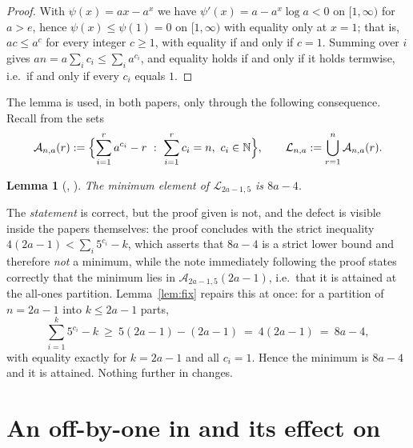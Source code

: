 \documentclass[11pt,a4paper]{article}
\theoremstyle{plain}
\newtheorem{lemma}[theorem]{Lemma}
\theoremstyle{definition}
\newcommand{\NN}{\mathbb{N}}
\begin{document}
\begin{proof}
With $\psi(x)=ax-a^{x}$ we have $\psi'(x)=a-a^{x}\log a<0$ on $[1,\infty)$ for $a>e$,
hence $\psi(x)\le\psi(1)=0$ on $[1,\infty)$ with equality only at $x=1$; that is,
$ac\le a^{c}$ for every integer $c\ge 1$, with equality if and only if $c=1$. Summing
over $i$ gives $an=a\sum_{i}c_{i}\le\sum_{i}a^{c_{i}}$, and equality holds if and
only if it holds termwise, i.e.\ if and only if every $c_{i}$ equals $1$.
\end{proof}

The lemma is used, in both papers, only through the following consequence. Recall
from \cite{CMM10,CMM20} the sets
\[
  \mathcal{A}_{n,a}(r):=\Bigl\{\sum_{i=1}^{r}a^{c_{i}}-r\ :\
    \sum_{i=1}^{r}c_{i}=n,\ c_{i}\in\NN\Bigr\},
  \qquad
  \mathcal{L}_{n,a}:=\bigcup_{r=1}^{n}\mathcal{A}_{n,a}(r).
\]

\begin{lemma}[{\cite[Lemma 3.6]{CMM10}}, {\cite[Lemma 24]{CMM20}}]\label{lem:min}
The minimum element of $\mathcal{L}_{2a-1,5}$ is $8a-4$.
\end{lemma}

The \emph{statement} is correct, but the proof given is not, and the defect is
visible inside the papers themselves: the proof concludes with the strict inequality
$4(2a-1)<\sum_{i}5^{c_{i}}-k$, which asserts that $8a-4$ is a strict lower bound and
therefore \emph{not} a minimum, while the note immediately following the proof states
correctly that the minimum lies in $\mathcal{A}_{2a-1,5}(2a-1)$, i.e.\ that it is
attained at the all-ones partition. Lemma~\ref{lem:fix} repairs this at once: for a
partition of $n=2a-1$ into $k\le 2a-1$ parts,
\[
  \sum_{i=1}^{k}5^{c_{i}}-k\ \ge\ 5(2a-1)-(2a-1)\ =\ 4(2a-1)\ =\ 8a-4 ,
\]
with equality exactly for $k=2a-1$ and all $c_{i}=1$. Hence the minimum is $8a-4$ and
it is attained. Nothing further in \cite{CMM10,CMM20} changes.

\section{An off-by-one in \cite[Remark 3.7]{CMM10} and its effect on
\cite[Corollary 1.11]{CMM10}}\label{sec:offbyone}
\end{document}
